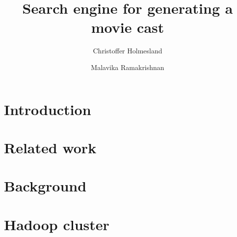 \documentclass[sigconf]{acmart}
\begin{document}
\sloppy
	
		
	\title{Search engine for generating a movie cast}
	
	\author{Christoffer Holmesland}
	
	\author{Malavika Ramakrishnan}
	
	
	\begin{abstract}
	
	\end{abstract}
	
	
	\maketitle
	
	
	
	
	\section{Introduction}
	\label{sec:introduction}
	
	
	
	
	\section{Related work}
	\label{sec:relatedwork}
	
	
	
	\section{Background}
	\label{sec:background}
	
	
	
	\section{Hadoop cluster}
	\label{sec:hadoop}
	
	
\end{document}
